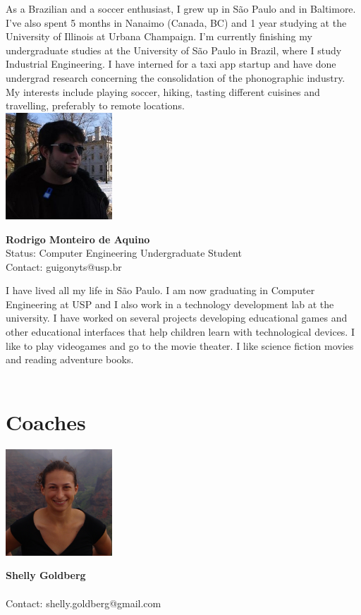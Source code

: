 As a Brazilian and a soccer enthusiast, I grew up in S\~{a}o Paulo and in Baltimore. I've also spent 5 months in Nanaimo (Canada, BC) and 1 year studying at the University of Illinois at Urbana Champaign. I'm currently finishing my undergraduate studies at the University of S\~{a}o Paulo in Brazil, where I study Industrial Engineering. I have interned for a taxi app startup and have done undergrad research concerning the consolidation of the phonographic industry. My interests include playing soccer, hiking, tasting different cuisines and travelling, preferably to remote locations. 
\\

\noindent \includegraphics[width=40mm]{images/image014}
\parbox[b]{0.6\textwidth}{\textbf{Rodrigo Monteiro de Aquino}\\
Status: Computer Engineering Undergraduate Student \\
Contact: guigonyts@usp.br \\
}

I have lived all my life in S\~{a}o Paulo. I am now graduating in Computer Engineering at USP and I also work in a technology development lab at the university. I have worked on several projects developing educational games and other educational interfaces that help children learn with technological devices.  I like to play videogames and go to the movie theater. I like science fiction movies and reading adventure books.
\\ \\

\section{Coaches}

\noindent \includegraphics[width=40mm]{images/shelly.png}
\parbox[b]{0.6\textwidth}{\textbf{Shelly Goldberg}\\ \\
Contact: shelly.goldberg@gmail.com  \\
}

